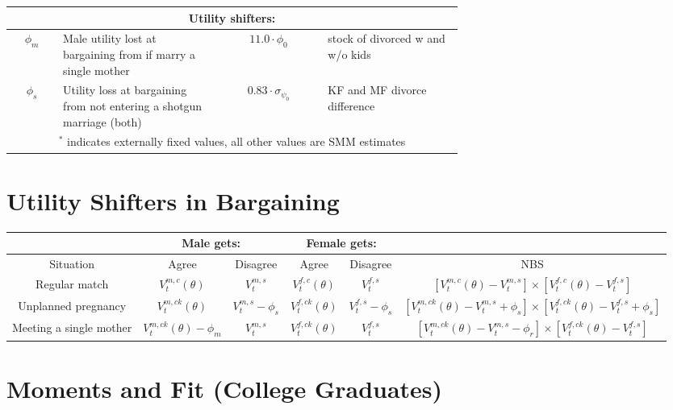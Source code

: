\documentclass[12pt,letter]{article}
\begin{document}
\begin{center}
\begin{tabular}{|c|p{0.35\linewidth}|c|p{0.3\linewidth}|}
\multicolumn{4}{|c|}{Utility shifters:}\\\hline
$\phi_m$ & {\footnotesize Male utility lost at bargaining from if marry a single mother} &  $11.0\cdot \phi_0$ & {\footnotesize stock of divorced w and w/o kids} \\
$\phi_s$ &{\footnotesize  Utility loss at bargaining from not entering a shotgun marriage (both)} & $0.83\cdot \sigma_{\psi_0}$ & {\footnotesize KF and MF divorce difference} \\\hline
\multicolumn{4}{|c|}{${}^*$ indicates externally fixed values, all other values are SMM estimates }\\\hline
\end{tabular}
\end{center}

\section{Utility Shifters in Bargaining}
{\footnotesize
\begin{tabular}{|c||c|c||c|c||c|}\hline
 & \multicolumn{2}{|c||}{Male gets:} & \multicolumn{2}{|c||}{Female gets:} &  \\\hline
Situation & Agree & Disagree & Agree & Disagree &  NBS \\\hline
Regular match & $V^{m,c}_t(\theta)$ & $V^{m,s}_t$ & $V^{f,c}_t(\theta)$ & $V^{f,s}_t$ & $\scriptstyle \left[ V^{m,c}_t(\theta) - V^{m,s}_t\right]\times \left[ V^{f,c}_t(\theta) - V^{f,s}_t\right]$\\
Unplanned pregnancy & $V^{m,ck}_t(\theta)$ & $V^{m,s}_t - \phi_s$ & $V^{f,ck}_t(\theta)$ & $V^{f,s}_t - \phi_s$ & $\scriptstyle  \left[ V^{m,ck}_t(\theta) - V^{m,s}_t + \phi_s\right]\times \left[ V^{f,ck}_t(\theta) - V^{f,s}_t + \phi_s\right]$\\
Meeting a single mother & $V^{m,ck}_t(\theta) - \phi_m$ & $V^{m,s}_t$ & $V^{f,ck}_t(\theta)$ & $V^{f,s}_t$ & $\scriptstyle  \left[ V^{m,ck}_t(\theta) - V^{m,s}_t - \phi_r\right]\times \left[ V^{f,ck}_t(\theta) - V^{f,s}_t\right]$\\\hline
\end{tabular}
}


\newpage
\section{Moments and Fit (College Graduates)}
\end{document}
